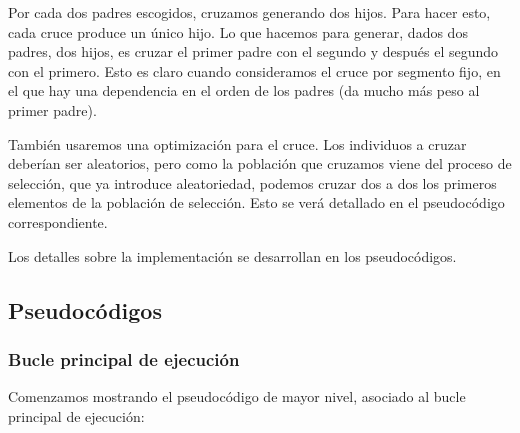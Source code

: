 \documentclass[11pt]{article}
\begin{document}
Por cada dos padres escogidos, cruzamos generando dos hijos. Para hacer esto, cada cruce produce un único hijo. Lo que hacemos para generar, dados dos padres, dos hijos, es cruzar el primer padre con el segundo y después el segundo con el primero. Esto es claro cuando consideramos el cruce por segmento fijo, en el que hay una dependencia en el orden de los padres (da mucho más peso al primer padre).

También usaremos una optimización para el cruce. Los individuos a cruzar deberían ser aleatorios, pero como la población que cruzamos viene del proceso de selección, que ya introduce aleatoriedad, podemos cruzar dos a dos los primeros elementos de la población de selección. Esto se verá detallado en el pseudocódigo correspondiente.

Los detalles sobre la implementación se desarrollan en los pseudocódigos.

\subsection{Pseudocódigos}

\subsubsection{Bucle principal de ejecución}

Comenzamos mostrando el pseudocódigo de mayor nivel, asociado al bucle principal de ejecución:
\end{document}
